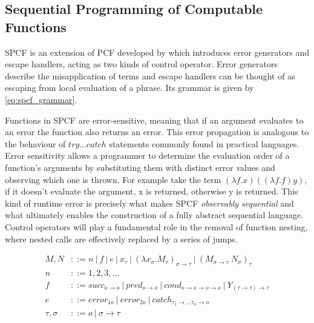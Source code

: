 \documentclass[12pt,a4paper]{report}
\theoremstyle{definition}
\theoremstyle{remark}
\begin{document}
\subsection{Sequential Programming of Computable Functions}\label{sec:spcf}
SPCF is an extension of PCF developed by \cite{cartwright_1992} which introduces error generators and escape handlers, acting as two kinds of control operator. Error generators describe the misapplication of terms and escape handlers can be thought of as escaping from local evaluation of a phrase. Its grammar is given by \eqref{eq:spcf_grammar}.

Functions in SPCF are error-sensitive, meaning that if an argument evaluates to an error the function also returns an error. This error propagation is analogous to the behaviour of $try...catch$ statements commonly found in practical languages. Error sensitivity allows a programmer to determine the evaluation order of a function's arguments by substituting them with distinct error values and observing which one is thrown. For example take the term $(\lambda f.x)((\lambda f.f)y)$, if it doesn't evaluate the argument, x is returned, otherwise y is returned. This kind of runtime error is precisely what makes SPCF \textit{observably sequential} and what ultimately enables the construction of a fully abstract sequential language. Control operators will play a fundamental role in the removal of function nesting, where nested calls are effectively replaced by a series of jumps.

\begin{equation} \label{eq:spcf_grammar}
\begin{split}
    M,N &::= n\ |\ f\ |\ e\ |\ x_{\tau}\ |\ (\lambda x_{\sigma} .M_{\tau})_{\sigma \rightarrow \tau}\ |\ (M_{\sigma \rightarrow \tau} \ N_{\sigma})_{\tau}\\
    n &::= 1, 2, 3, \dots\\
    f &::= succ_{o \rightarrow o} \ | \ pred_{o \rightarrow o} \ | \ cond_{o \rightarrow o \rightarrow o \rightarrow o} \ | \ Y_{(\tau \rightarrow \tau) \rightarrow \tau}\\
    e &::= error_{1o}\ |\ error_{2o}\ |\ catch_{\tau_1 \rightarrow \dots \tau_n \rightarrow o}\\
    \tau , \sigma &::= o\ |\ \sigma \rightarrow \tau
\end{split}
\end{equation}
\end{document}
